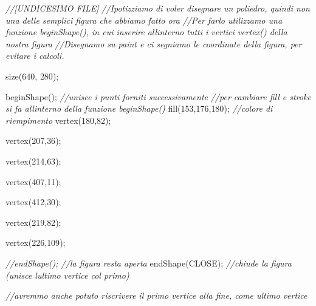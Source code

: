 \documentclass[
]{article}
\newenvironment{Shaded}{}{}
\newcommand{\CommentTok}[1]{\textcolor[rgb]{0.38,0.63,0.69}{\textit{#1}}}
\newcommand{\DecValTok}[1]{\textcolor[rgb]{0.25,0.63,0.44}{#1}}
\newcommand{\FunctionTok}[1]{\textcolor[rgb]{0.02,0.16,0.49}{#1}}
\newcommand{\NormalTok}[1]{#1}
\newcommand{\OperatorTok}[1]{\textcolor[rgb]{0.40,0.40,0.40}{#1}}
\begin{document}
\begin{Shaded}
\begin{Highlighting}[]
\CommentTok{//[UNDICESIMO FILE]
}
\CommentTok{//Ipotizziamo di voler disegnare un poliedro, quindi non una delle semplici figura che abbiamo fatto ora
}
\CommentTok{//Per farlo utilizzamo una funzione \textquotesingle{}beginShape()\textquotesingle{}, in cui inserire all\textquotesingle{}interno tutti i vertici \textquotesingle{}vertex()\textquotesingle{} della nostra figura
}
\CommentTok{//Disegnamo su paint e ci segniamo le coordinate della figura, per evitare i calcoli.
}


\FunctionTok{size}\OperatorTok{(}\DecValTok{640}\OperatorTok{,} \DecValTok{280}\OperatorTok{);}



\FunctionTok{beginShape}\OperatorTok{();} \CommentTok{//unisce i punti forniti successivamente
}
\CommentTok{//per cambiare fill e stroke si fa all\textquotesingle{}interno della funzione \textquotesingle{}beginShape()\textquotesingle{}
}
\FunctionTok{fill}\OperatorTok{(}\DecValTok{153}\OperatorTok{,}\DecValTok{176}\OperatorTok{,}\DecValTok{180}\OperatorTok{);} \CommentTok{//colore di riempimento
}
\FunctionTok{vertex}\OperatorTok{(}\DecValTok{180}\OperatorTok{,}\DecValTok{82}\OperatorTok{);}

\FunctionTok{vertex}\OperatorTok{(}\DecValTok{207}\OperatorTok{,}\DecValTok{36}\OperatorTok{);}

\FunctionTok{vertex}\OperatorTok{(}\DecValTok{214}\OperatorTok{,}\DecValTok{63}\OperatorTok{);}

\FunctionTok{vertex}\OperatorTok{(}\DecValTok{407}\OperatorTok{,}\DecValTok{11}\OperatorTok{);}

\FunctionTok{vertex}\OperatorTok{(}\DecValTok{412}\OperatorTok{,}\DecValTok{30}\OperatorTok{);}

\FunctionTok{vertex}\OperatorTok{(}\DecValTok{219}\OperatorTok{,}\DecValTok{82}\OperatorTok{);}

\FunctionTok{vertex}\OperatorTok{(}\DecValTok{226}\OperatorTok{,}\DecValTok{109}\OperatorTok{);}

\CommentTok{//endShape(); //la figura resta aperta
}
\FunctionTok{endShape}\OperatorTok{(}\NormalTok{CLOSE}\OperatorTok{);} \CommentTok{//chiude la figura (unisce l\textquotesingle{}ultimo vertice col primo)
}


\CommentTok{//avremmo anche potuto riscrivere il primo vertice alla fine, come ultimo vertice}
\end{Highlighting}
\end{Shaded}
\end{document}
